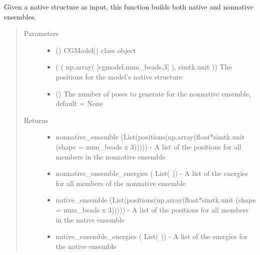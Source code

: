 \documentclass[letterpaper,12pt,english,openany,oneside]{sphinxmanual}
\begin{document}
\begin{fulllineitems}
\label{\detokenize{ensembles:ensembles.ens_build.get_ensembles}}
Given a native structure as input, this function builds both native and nonnative ensembles.
\begin{quote}\begin{description}
\item[{Parameters}] \leavevmode\begin{itemize}
\item {} 
 () \textendash{} CGModel() class object

\item {} 
 ( ( np.array( {[}cgmodel.num\_beads,3{]} ), simtk.unit )) \textendash{} The positions for the model’s native structure

\item {} 
 () \textendash{} The number of poses to generate for the nonnative ensemble, default = None

\end{itemize}

\item[{Returns}] \leavevmode
\begin{itemize}
\item {} 
nonnative\_ensemble (List(positions(np.array(float*simtk.unit (shape = num\_beads x 3))))) - A list of the positions for all members in the nonnative ensemble

\item {} 
nonnative\_ensemble\_energies ( List( )) - A list of the energies for all members of the nonnative ensemble

\item {} 
native\_ensemble (List(positions(np.array(float*simtk.unit (shape = num\_beads x 3))))) - A list of the positions for all members in the native ensemble

\item {} 
native\_ensemble\_energies ( List( )) - A list of the energies for the native ensemble

\end{itemize}


\end{description}\end{quote}

\end{fulllineitems}
\end{document}
